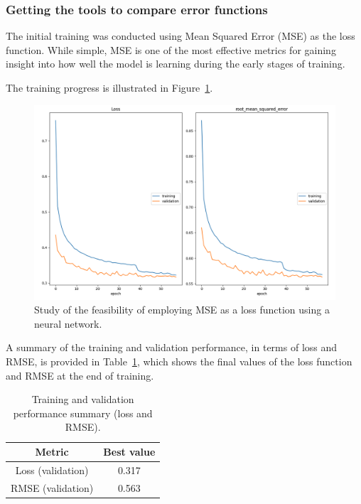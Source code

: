 \subsubsection{Getting the tools to compare error functions}

The initial training was conducted using Mean Squared Error (MSE) as the loss function. While simple, MSE is one of the most effective metrics for gaining insight into how well the model is learning during the early stages of training.

The training progress is illustrated in Figure~\ref{fig:mse_reg_net_train}.

\begin{figure}[H]
    \centering
    \includegraphics[width=1\textwidth]{figures/neural_net_regression_research/train_mse_neural_net.png}
    \caption{Study of the feasibility of employing MSE as a loss function using a neural network.}
    \label{fig:mse_reg_net_train}
\end{figure}

A summary of the training and validation performance, in terms of loss and RMSE, is provided in Table~\ref{tab:loss-rmse}, which shows the final values of the loss function and RMSE at the end of training.


\begin{table}[ht]
    \centering
    \begin{tabular}{|c|c|}
    \hline
    \textbf{Metric} & \textbf{Best value} \\
    \hline
    Loss (validation) & 0.317 \\
    RMSE (validation) & 0.563 \\
    \hline
    \end{tabular}
    \caption{Training and validation performance summary (loss and RMSE).}
    \label{tab:loss-rmse}
\end{table}

